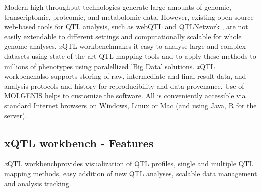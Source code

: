 \documentclass[8pt, twoside, a5paper]{report}
\newcommand{\xqtlwb}{{\it x}QTL workbench}
\begin{document}
Modern high throughput technologies generate large amounts of genomic, transcriptomic, proteomic, and metabolomic 
data. However, existing open source web-based tools for QTL analysis, such as webQTL\cite{Wang:2003} and 
QTLNetwork \cite{Yang:2008}, are not easily extendable to different settings and computationally scalable 
for whole genome analyses. \xqtlwb makes it easy to analyse large and complex datasets using state-of-the-art QTL 
mapping tools and to apply these methods to millions of phenotypes using paralellized 'Big Data' 
solutions\cite{Trelles:2011}. \xqtlwb also supports storing of raw, intermediate and final result data, and 
analysis protocols and history for reproducibility and data provenance. Use of MOLGENIS\cite{Swertz:2010b} 
helps to customize the software. All is conveniently accessible via standard Internet browsers on Windows, 
Linux or Mac (and using Java, R for the server).

\subsection{xQTL workbench - Features}
\xqtlwb provides visualization of QTL profiles, single and multiple QTL mapping methods, easy addition of new QTL 
analyses, scalable data management and analysis tracking.
\end{document}
